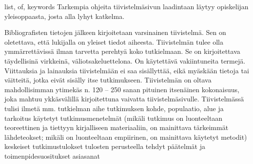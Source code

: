 \begin{itabstract}{list, of, keywords}
Tarkempia ohjeita tiivistelmäsivun laadintaan läytyy opiskelijan
yleisoppaasta, josta alla lyhyt katkelma.

Bibliografisten tietojen jälkeen kirjoitetaan varsinainen tiivistelmä.
Sen on oletettava, että lukijalla on yleiset tiedot aiheesta.
Tiivistelmän tulee olla ymmärrettävissä ilman tarvetta perehtyä koko
tutkielmaan. Se on kirjoitettava täydellisinä virkkeinä,
väliotsakeluettelona. On käytettävä vakiintuneita termejä. Viittauksia
ja lainauksia tiivistelmään ei saa sisällyttää, eikä myäskään tietoja
tai väitteitä, jotka eivät sisälly itse tutkimukseen. Tiivistelmän on
oltava mahdollisimman ytimekäs n. 120 -- 250 sanan pituinen itsenäinen
kokonaisuus, joka mahtuu ykkäsvälillä kirjoitettuna vaivatta
tiivistelmäsivulle. Tiivistelmässä tulisi ilmetä mm.  tutkielman aihe
tutkimuksen kohde, populaatio, alue ja tarkoitus käytetyt
tutkimusmenetelmät (mikäli tutkimus on luonteeltaan teoreettinen ja
tiettyyn kirjalliseen materiaaliin, on mainittava tärkeimmät
lähdeteokset; mikäli on luonteeltaan empiirinen, on mainittava käytetyt
metodit) keskeiset tutkimustulokset tulosten perusteella tehdyt
päätelmät ja toimenpidesuositukset asiasanat
\end{itabstract}
